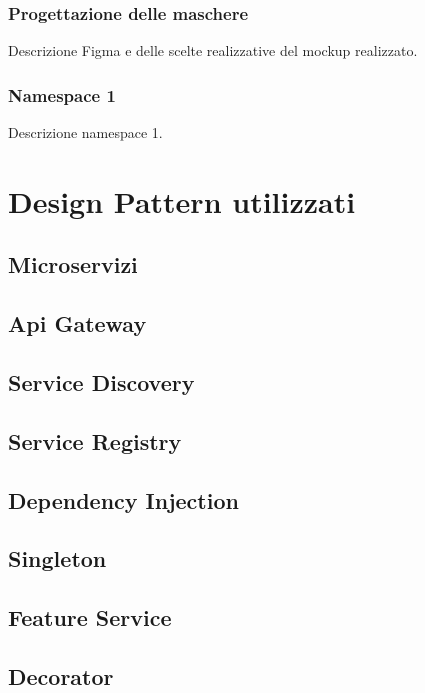 \subsubsection{Progettazione delle maschere}
Descrizione Figma e delle scelte realizzative del mockup realizzato.


\subsubsection{Namespace 1} %
Descrizione namespace 1.

\begin{namespacedesc}
\end{namespacedesc}


\section{Design Pattern utilizzati}
\subsection{Microservizi}
\subsection{Api Gateway}
\subsection{Service Discovery}
\subsection{Service Registry}
\subsection{Dependency Injection}
\subsection{Singleton}
\subsection{Feature Service}
\subsection{Decorator}
